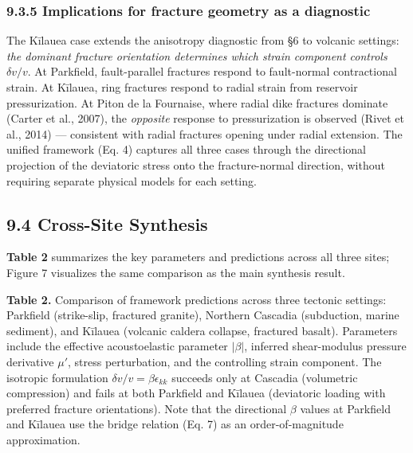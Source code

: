 \documentclass[12pt]{article}
\begin{document}
\subsubsection{9.3.5 Implications for fracture geometry as a
diagnostic}\label{implications-for-fracture-geometry-as-a-diagnostic}

The Kīlauea case extends the anisotropy diagnostic from §6 to volcanic
settings: \emph{the dominant fracture orientation determines which
strain component controls \(\delta v/v\)}. At Parkfield, fault-parallel
fractures respond to fault-normal contractional strain. At Kīlauea, ring
fractures respond to radial strain from reservoir pressurization. At
Piton de la Fournaise, where radial dike fractures dominate (Carter et
al., 2007), the \emph{opposite} response to pressurization is observed
(Rivet et al., 2014) --- consistent with radial fractures opening under
radial extension. The unified framework (Eq. 4) captures all three cases
through the directional projection of the deviatoric stress onto the
fracture-normal direction, without requiring separate physical models
for each setting.

\subsection{9.4 Cross-Site Synthesis}\label{cross-site-synthesis}

\textbf{Table 2} summarizes the key parameters and predictions across
all three sites; Figure 7 visualizes the same comparison as the main
synthesis result.

\textbf{Table 2.} Comparison of framework predictions across three
tectonic settings: Parkfield (strike-slip, fractured granite), Northern
Cascadia (subduction, marine sediment), and Kīlauea (volcanic caldera
collapse, fractured basalt). Parameters include the effective
acoustoelastic parameter \(|\beta|\), inferred shear-modulus pressure
derivative \(\mu'\), stress perturbation, and the controlling strain
component. The isotropic formulation \(\delta v/v = \beta\epsilon_{kk}\)
succeeds only at Cascadia (volumetric compression) and fails at both
Parkfield and Kīlauea (deviatoric loading with preferred fracture
orientations). Note that the directional \(\beta\) values at Parkfield
and Kīlauea use the bridge relation (Eq. 7) as an order-of-magnitude
approximation.
\end{document}
